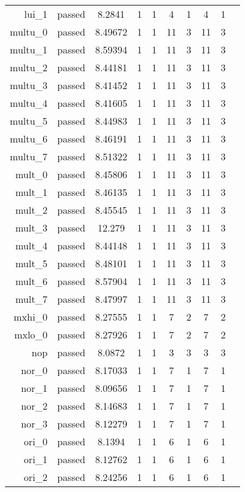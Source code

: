 \begin{longtable}{r|ccccccccc}
    lui\_1 & passed & 8.2841 & 1 & 1 & 4 & 1 & 4 & 1 \\
    multu\_0 & passed & 8.49672 & 1 & 1 & 11 & 3 & 11 & 3 \\
    multu\_1 & passed & 8.59394 & 1 & 1 & 11 & 3 & 11 & 3 \\
    multu\_2 & passed & 8.44181 & 1 & 1 & 11 & 3 & 11 & 3 \\
    multu\_3 & passed & 8.41452 & 1 & 1 & 11 & 3 & 11 & 3 \\
    multu\_4 & passed & 8.41605 & 1 & 1 & 11 & 3 & 11 & 3 \\
    multu\_5 & passed & 8.44983 & 1 & 1 & 11 & 3 & 11 & 3 \\
    multu\_6 & passed & 8.46191 & 1 & 1 & 11 & 3 & 11 & 3 \\
    multu\_7 & passed & 8.51322 & 1 & 1 & 11 & 3 & 11 & 3 \\
    mult\_0 & passed & 8.45806 & 1 & 1 & 11 & 3 & 11 & 3 \\
    mult\_1 & passed & 8.46135 & 1 & 1 & 11 & 3 & 11 & 3 \\
    mult\_2 & passed & 8.45545 & 1 & 1 & 11 & 3 & 11 & 3 \\
    mult\_3 & passed & 12.279 & 1 & 1 & 11 & 3 & 11 & 3 \\
    mult\_4 & passed & 8.44148 & 1 & 1 & 11 & 3 & 11 & 3 \\
    mult\_5 & passed & 8.48101 & 1 & 1 & 11 & 3 & 11 & 3 \\
    mult\_6 & passed & 8.57904 & 1 & 1 & 11 & 3 & 11 & 3 \\
    mult\_7 & passed & 8.47997 & 1 & 1 & 11 & 3 & 11 & 3 \\
    mxhi\_0 & passed & 8.27555 & 1 & 1 & 7 & 2 & 7 & 2 \\
    mxlo\_0 & passed & 8.27926 & 1 & 1 & 7 & 2 & 7 & 2 \\
    nop & passed & 8.0872 & 1 & 1 & 3 & 3 & 3 & 3 \\
    nor\_0 & passed & 8.17033 & 1 & 1 & 7 & 1 & 7 & 1 \\
    nor\_1 & passed & 8.09656 & 1 & 1 & 7 & 1 & 7 & 1 \\
    nor\_2 & passed & 8.14683 & 1 & 1 & 7 & 1 & 7 & 1 \\
    nor\_3 & passed & 8.12279 & 1 & 1 & 7 & 1 & 7 & 1 \\
    ori\_0 & passed & 8.1394 & 1 & 1 & 6 & 1 & 6 & 1 \\
    ori\_1 & passed & 8.12762 & 1 & 1 & 6 & 1 & 6 & 1 \\
    ori\_2 & passed & 8.24256 & 1 & 1 & 6 & 1 & 6 & 1 \\

\end{longtable}
